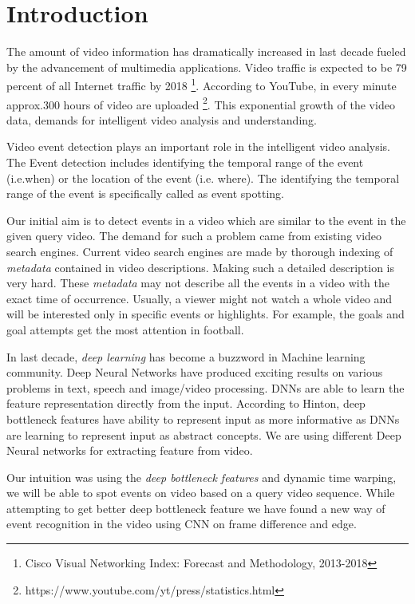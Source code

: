 \chapter{Introduction}
\label{chap:intro}

The amount of video information has dramatically increased in last decade fueled by the advancement of multimedia applications. Video traffic is expected to be  79 percent of all Internet traffic by 2018 \footnote{Cisco Visual Networking Index: Forecast and Methodology, 2013-2018}. According to YouTube, in every minute approx.300 hours of video are uploaded \footnote{https://www.youtube.com/yt/press/statistics.html}. This exponential growth of the video data, demands for intelligent video analysis and understanding.

Video event detection plays an important role in the intelligent video analysis. The Event detection includes identifying the temporal range of the event (i.e.when) or the location of the event (i.e. where). The identifying the temporal range of the event is specifically called as event spotting. 

Our initial aim is to detect events in a video which are similar to the event in the given query video. The demand for such a problem came from existing video search engines. Current video search engines are made by thorough indexing of \textit{metadata} contained in video descriptions. Making such a detailed description is very hard. These \textit{metadata} may not describe all the events in a video with the exact time of occurrence. Usually, a viewer might not watch a whole video and will be interested only in specific events or highlights. For example, the goals and goal attempts get the most attention in football.

In last decade, \textit{deep learning} has become a  buzzword in Machine learning community. Deep Neural Networks have produced exciting results on various problems in text, speech and image/video processing. DNNs are able to learn the feature representation directly from the input. According to Hinton, deep bottleneck features have ability to represent input as more informative as DNNs are learning to represent input as abstract concepts. We are using different Deep Neural networks for extracting feature from video.

Our intuition was using the \textit{deep bottleneck features} and dynamic time warping, we will be able to spot events on video based on a query video sequence. While attempting  to get better deep bottleneck feature we have found a new  way of event recognition in the video using CNN on frame difference and edge.

